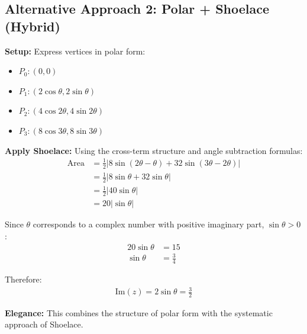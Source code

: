 \documentclass[12pt]{article}
\begin{document}
\begin{solutionbox}
\subsection*{Alternative Approach 2: Polar + Shoelace (Hybrid)}

\textbf{Setup:} Express vertices in polar form:
\begin{itemize}
    \item $P_0: (0, 0)$
    \item $P_1: (2\cos\theta, 2\sin\theta)$
    \item $P_2: (4\cos 2\theta, 4\sin 2\theta)$
    \item $P_3: (8\cos 3\theta, 8\sin 3\theta)$
\end{itemize}

\textbf{Apply Shoelace:}
Using the cross-term structure and angle subtraction formulas:
\begin{align*}
\text{Area} &= \frac{1}{2}|8\sin(2\theta - \theta) + 32\sin(3\theta - 2\theta)| \\
&= \frac{1}{2}|8\sin\theta + 32\sin\theta| \\
&= \frac{1}{2}|40\sin\theta| \\
&= 20|\sin\theta|
\end{align*}

Since $\theta$ corresponds to a complex number with positive imaginary part, $\sin\theta > 0$:
\begin{align*}
20\sin\theta &= 15 \\
\sin\theta &= \frac{3}{4}
\end{align*}

Therefore:
\begin{align*}
\text{Im}(z) = 2\sin\theta = \frac{3}{2}
\end{align*}

\textbf{Elegance:} This combines the structure of polar form with the systematic approach of Shoelace.
\end{solutionbox}

\vspace{1em}
\end{document}
